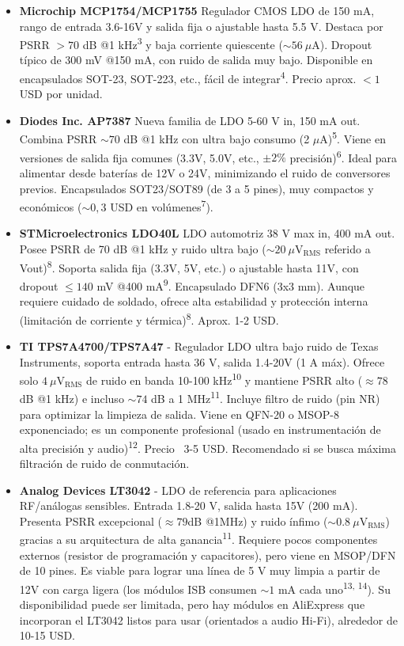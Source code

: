 \documentclass[a4paper, 12pt]{article}
\begin{document}
\begin{itemize}
    \item \textbf{Microchip MCP1754/MCP1755} Regulador CMOS LDO de 150 mA, rango de entrada 3.6-16V y salida fija o ajustable hasta 5.5 V. Destaca por PSRR $>70$ dB @1 kHz\textsuperscript{3} y baja corriente quiescente ($\sim 56~\mu$A). Dropout típico de 300 mV @150 mA, con ruido de salida muy bajo. Disponible en encapsulados SOT-23, SOT-223, etc., fácil de integrar\textsuperscript{4}. Precio aprox. $< 1$ USD por unidad.

    \item \textbf{Diodes Inc. AP7387} Nueva familia de LDO 5-60 V in, 150 mA out. Combina PSRR $\sim 70$ dB @1 kHz con ultra bajo consumo (2 $\mu$A)\textsuperscript{5}. Viene en versiones de salida fija comunes (3.3V, 5.0V, etc., $\pm 2\%$ precisión)\textsuperscript{6}. Ideal para alimentar desde baterías de 12V o 24V, minimizando el ruido de conversores previos. Encapsulados SOT23/SOT89 (de 3 a 5 pines), muy compactos y económicos ($\sim 0,3$ USD en volúmenes\textsuperscript{7}).

    \item \textbf{STMicroelectronics LDO40L} LDO automotriz 38 V max in, 400 mA out. Posee PSRR de 70 dB @1 kHz y ruido ultra bajo ($\sim 20~\mu\text{V}_{\text{RMS}}$ referido a Vout)\textsuperscript{8}. Soporta salida fija (3.3V, 5V, etc.) o ajustable hasta 11V, con dropout $\le 140$ mV @400 mA\textsuperscript{9}. Encapsulado DFN6 (3x3 mm). Aunque requiere cuidado de soldado, ofrece alta estabilidad y protección interna (limitación de corriente y térmica)\textsuperscript{8}. Aprox. 1-2 USD.

    \item \textbf{TI TPS7A4700/TPS7A47} - Regulador LDO ultra bajo ruido de Texas Instruments, soporta entrada hasta 36 V, salida 1.4-20V (1 A máx). Ofrece solo $4~\mu\text{V}_{\text{RMS}}$ de ruido en banda 10-100 kHz\textsuperscript{10} y mantiene PSRR alto ($\approx 78$ dB @1 kHz) e incluso $\sim 74$ dB a 1 MHz\textsuperscript{11}. Incluye filtro de ruido (pin NR) para optimizar la limpieza de salida. Viene en QFN-20 o MSOP-8 exponenciado; es un componente profesional (usado en instrumentación de alta precisión y audio)\textsuperscript{12}. Precio ~3-5 USD. Recomendado si se busca máxima filtración de ruido de conmutación.

    \item \textbf{Analog Devices LT3042} - LDO de referencia para aplicaciones RF/análogas sensibles. Entrada 1.8-20 V, salida hasta 15V (200 mA). Presenta PSRR excepcional ($\approx 79$dB @1MHz) y ruido ínfimo ($\sim 0.8~\mu\text{V}_{\text{RMS}}$) gracias a su arquitectura de alta ganancia\textsuperscript{11}. Requiere pocos componentes externos (resistor de programación y capacitores), pero viene en MSOP/DFN de 10 pines. Es viable para lograr una línea de 5 V muy limpia a partir de 12V con carga ligera (los módulos ISB consumen $\sim 1$ mA cada uno\textsuperscript{13, 14}). Su disponibilidad puede ser limitada, pero hay módulos en AliExpress que incorporan el LT3042 listos para usar (orientados a audio Hi-Fi), alrededor de 10-15 USD.
\end{itemize}
\end{document}
